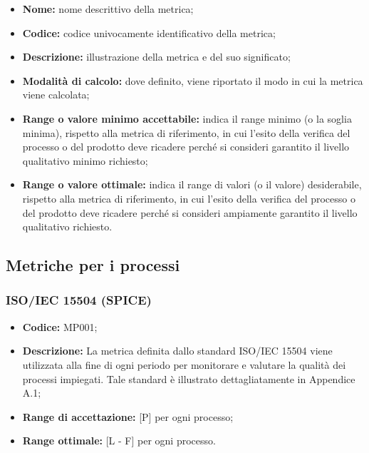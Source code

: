 \documentclass[../NormediProgetto.tex]{subfiles}
\begin{document}
\begin{itemize}
	\item \textbf{Nome:} nome descrittivo della metrica;
	
	\item \textbf{Codice:} codice univocamente identificativo della metrica;
	
	\item \textbf{Descrizione:} illustrazione della metrica e del suo significato; 
	
	\item \textbf{Modalità di calcolo:} dove definito, viene riportato il modo in cui la metrica viene calcolata;
	
	\item \textbf{Range o valore minimo accettabile:} indica il range minimo (o la soglia minima), rispetto alla metrica di riferimento, in cui l'esito della verifica del processo o del prodotto deve ricadere perché si consideri garantito il livello qualitativo minimo richiesto;
	
	\item \textbf{Range o valore ottimale:} indica il range di valori (o il valore) desiderabile, rispetto alla metrica di riferimento, in cui l'esito della verifica del processo o del prodotto deve ricadere perché si consideri ampiamente garantito il livello qualitativo richiesto.
\end{itemize}



\subsection{Metriche per i processi}

\subsubsection{ISO/IEC 15504 (SPICE)}

\begin{itemize}
	\item \textbf{Codice:} MP001;
	\item \textbf{Descrizione:} La metrica definita dallo standard ISO/IEC 15504 viene utilizzata alla fine di ogni periodo per monitorare e valutare la qualità dei processi impiegati. Tale standard è illustrato dettagliatamente in Appendice A.1;
	\item \textbf{Range di accettazione:} [P] per ogni processo;
	\item \textbf{Range ottimale:} [L - F] per ogni processo.
\end{itemize}
\end{document}
